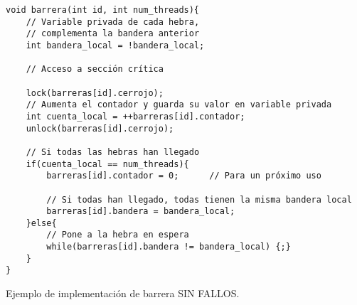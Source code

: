 \begin{listing}
\begin{verbatim}
void barrera(int id, int num_threads){
    // Variable privada de cada hebra,
    // complementa la bandera anterior
    int bandera_local = !bandera_local;

    // Acceso a sección crítica

    lock(barreras[id].cerrojo);
    // Aumenta el contador y guarda su valor en variable privada
    int cuenta_local = ++barreras[id].contador;
    unlock(barreras[id].cerrojo);

    // Si todas las hebras han llegado
    if(cuenta_local == num_threads){
        barreras[id].contador = 0;      // Para un próximo uso

        // Si todas han llegado, todas tienen la misma bandera local
        barreras[id].bandera = bandera_local;
    }else{
        // Pone a la hebra en espera
        while(barreras[id].bandera != bandera_local) {;}
    }
}
\end{verbatim}
\caption{Ejemplo de implementación de barrera SIN FALLOS.}
\label{implementacion_barrera_2}
\end{listing}

